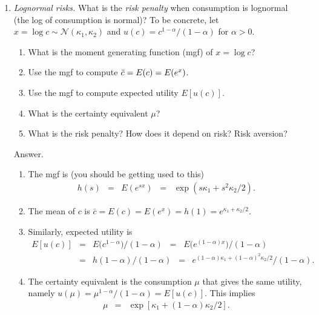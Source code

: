 \begin{enumerate}
\item {\it Lognormal risks.\/}
What is the {\it risk penalty\/} when consumption is lognormal
(the log of consumption is normal)?
To be concrete, let $x = \log c \sim \mathcal{N}(\kappa_1, \kappa_2)$
and $u(c) = c^{1-\alpha}/(1-\alpha)$ for $\alpha> 0$.

\begin{enumerate}
\item What is the moment generating function (mgf) of $x = \log c$?
\item Use the mgf to compute $\bar{c} = E(c) = E(e^x)$.
\item Use the mgf to compute expected utility $ E[u(c)]$.
\item What is the certainty equivalent $\mu$?
\item What is the risk penalty?  How does it depend on risk?  Risk aversion?
\end{enumerate}
%
Answer.
\begin{enumerate}
\item The mgf is (you should be getting used to this)
\begin{eqnarray*}
   h(s) &=&  E(e^{sx}) \;\;=\;\; \exp ( s \kappa_1 + s^2 \kappa_2/2 ).
\end{eqnarray*}

\item The mean of $c$ is
$ \bar{c} = E(c) = E(e^x) = h(1) = e^{\kappa_1+\kappa_2/2}$.

\item Similarly, expected utility is
\begin{eqnarray*}
        E[u(c)] &=& E \Big(c^{1-\alpha}\Big)/(1-\alpha) \;\;=\;\; E \Big(e^{(1-\alpha) x}\Big)/(1-\alpha) \\
        &=& h(1-\alpha)/(1-\alpha) \;\;=\;\; e^{(1-\alpha)\kappa_1+(1-\alpha)^2\kappa_2/2}/(1-\alpha).
\end{eqnarray*}

\item The certainty equivalent is the consumption $\mu$ that gives the same utility,
namely $  u(\mu) = \mu^{1-\alpha}/(1-\alpha) = E[u(c)] $.
This implies
\begin{eqnarray*}
    \mu &=& \exp[ \kappa_1 + (1-\alpha) \kappa_2 /2 ] .
\end{eqnarray*}


\end{enumerate}
\end{enumerate}

